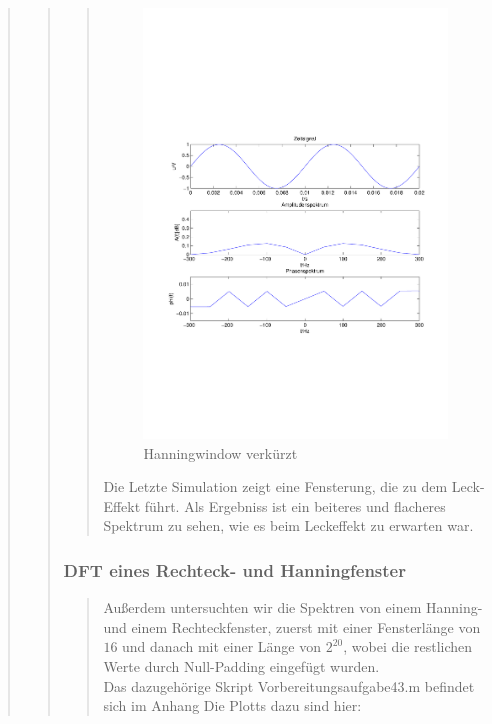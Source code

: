 \begin{quote}
\begin{quote}
\begin{quote}
            \begin{figure}[H]
            \centering
                \includegraphics[scale=0.5, trim = 1.5cm 7cm 1.5cm 8cm, clip]{./Bilder/Hanningwindowverkuerzt}
                    \caption{Hanningwindow verkürzt}
            \end{figure}
            
            Die Letzte Simulation zeigt eine Fensterung, die zu dem Leck-Effekt führt. Als Ergebniss ist ein beiteres
            und flacheres Spektrum zu sehen, wie es beim Leckeffekt zu erwarten war.
    			
		\end{quote}

        \subsubsection{DFT eines Rechteck- und Hanningfenster}
		\begin{quote}
            Außerdem untersuchten wir die Spektren von einem Hanning- und einem Rechteckfenster, zuerst mit einer
            Fensterlänge von $16$ und danach mit einer Länge von $2^20$, wobei die restlichen Werte durch Null-Padding
            eingefügt wurden.\\
            Das dazugehörige Skript Vorbereitungsaufgabe43.m befindet sich im Anhang
            Die Plotts dazu sind hier:
            

\end{quote}
\end{quote}
\end{quote}
